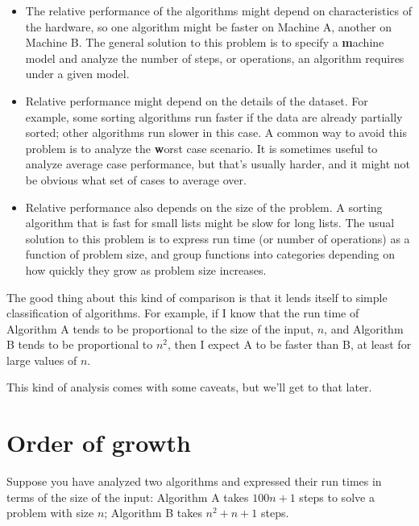 \documentclass[
DIV=11,
fontsize=13,
twoside,
headinclude=false,
titlepage=firstiscover,
abstract=true,
headsepline=true,
footsepline=true,
chapterprefix=true, %
headings=big,
bibliography=totoc,%
captions=tableheading
]{scrbook}
\theoremstyle{definition}
\begin{document}
\begin{itemize}

\item The relative performance of the algorithms might
depend on characteristics of the hardware, so one algorithm
might be faster on Machine A, another on Machine B.
The general solution to this problem is to specify a
{\textbf machine model} and analyze the number of steps, or
operations, an algorithm requires under a given model.

\item Relative performance might depend on the details of
the dataset.  For example, some sorting
algorithms run faster if the data are already partially sorted;
other algorithms run slower in this case.
A common way to avoid this problem is to analyze the
{\textbf worst case} scenario.  It is sometimes useful to
analyze average case performance, but that's usually harder,
and it might not be obvious what set of cases to average over.

\item Relative performance also depends on the size of the
problem.  A sorting algorithm that is fast for small lists
might be slow for long lists.
The usual solution to this problem is to express run time
(or number of operations) as a function of problem size,
and group functions into categories depending on how quickly
they grow as problem size increases.

\end{itemize}

The good thing about this kind of comparison is that it lends
itself to simple classification of algorithms.  For example,
if I know that the run time of Algorithm A tends to be
proportional to the size of the input, $n$, and Algorithm B
tends to be proportional to $n^2$, then I
expect A to be faster than B, at least for large values of $n$.

This kind of analysis comes with some caveats, but we'll get
to that later.


\section{Order of growth}

Suppose you have analyzed two algorithms and expressed
their run times in terms of the size of the input:
Algorithm A takes $100n+1$ steps to solve a problem with
size $n$; Algorithm B takes $n^2 + n + 1$ steps.
\end{document}
